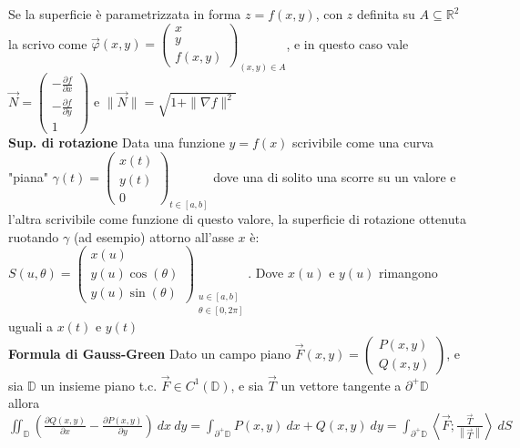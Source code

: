 \documentclass[a4paper, oneside]{article}
\newcommand\de{\partial}
\newcommand\bulletout  {\labelitemfont \textbullet}
\newcommand{\tab}{\hspace*{2em}}
\begin{document}
\bulletout Se la superficie è parametrizzata in forma $z=f(x,y)$, con $z$ definita su $A\subseteq\mathbb{R}^2$ la scrivo come $\vec{\varphi}(x,y) = \begin{pmatrix}
    x \\ y \\ f(x,y)
\end{pmatrix}_{(x,y)\in A}$, e in questo caso vale $\vec{N} = \begin{pmatrix}
    -\frac{\de f}{\de x} \\
    -\frac{\de f}{\de y} \\
    1
\end{pmatrix}$ e $\parallel\vec{N}\parallel = \sqrt{1+\parallel\nabla f \parallel^2}$\\
    \textbf{Sup. di rotazione}\tab
    Data una funzione $y=f(x)$ scrivibile come una curva "piana" $\gamma(t) = \begin{pmatrix} x(t) \\ y(t) \\ 0 \end{pmatrix}_{t\in[a,b]}$ dove una di solito una scorre su un valore e l'altra scrivibile come funzione di questo valore, la superficie di rotazione ottenuta ruotando $\gamma$ (ad esempio) attorno all'asse $x$ è: $S(u,\theta) = \begin{pmatrix}
        x(u) \\
        y(u)\cos(\theta) \\
        y(u)\sin(\theta)
    \end{pmatrix}_{\begin{matrix}
        u\in[a,b] \\ \theta\in[0,2\pi]
    \end{matrix}}$. Dove $x(u)$ e $y(u)$ rimangono uguali a $x(t)$ e $y(t)$ \\
    \textbf{Formula di Gauss-Green}\tab
    Dato un campo piano $\vec{F}(x,y)=\begin{pmatrix}
        P(x,y) \\
        Q(x,y)
    \end{pmatrix}$, e sia $\mathbb{D}$ un insieme piano t.c. $\vec{F}\in C^1(\mathbb{D})$, e sia $\vec{T}$ un vettore tangente a $\partial^+\mathbb{D}$ \\allora 
    $\iint_{\mathbb{D}} \left(\frac{\partial Q(x,y)}{\partial x} - \frac{\partial P(x,y)}{\partial y}\right) \ dx \ dy = \int_{\partial^+\mathbb{D}} P(x,y) \ dx + Q(x,y) \ dy = \int_{\partial^+\mathbb{D}} \left\langle \vec{F};\frac{\vec{T}}{\left\lVert\vec{T}\right\rVert }\right\rangle \ dS$\\
\end{document}
